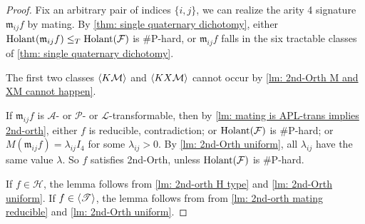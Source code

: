 \begin{proof}
    Fix an arbitrary pair of indices $\{i,j\}$, we can realize the arity 4 signature $\mathfrak{m}_{ij}f$ by mating.
    By \cref{thm: single quaternary dichotomy}, either $\operatorname{Holant}(\mathfrak{m}_{ij}f)\le_T\operatorname{Holant}(\mathcal{F})$ is \#P-hard, or $\mathfrak{m}_{ij}f$ falls in the six tractable classes of \cref{thm: single quaternary dichotomy}.
    
    The first two classes $\braket{K\mathcal{M}}$ and $\braket{KX\mathcal{M}}$ cannot occur by \cref{lm: 2nd-Orth M and XM cannot happen}.
    
    If $\mathfrak{m}_{ij}f$ is $\mathscr{A}$- or $\mathscr{P}$- or $\mathscr{L}$-transformable, then by \cref{lm: mating is APL-trans implies 2nd-orth}, either $f$ is reducible, contradiction; or $\operatorname{Holant}(\mathcal{F})$ is \#P-hard; or $M(\mathfrak{m}_{ij}f)=\lambda_{ij}I_4$ for some $\lambda_{ij}>0.$
    By \cref{lm: 2nd-Orth uniform}, all $\lambda_{ij}$ have the same value $\lambda$. 
    So $f$ satisfies {\sc 2nd-Orth}, unless $\operatorname{Holant}(\mathcal{F})$ is \#P-hard.

    If $f\in \mathscr{H}$, the lemma follows from \cref{lm: 2nd-orth H type} and \cref{lm: 2nd-Orth uniform}.
    If $f\in \braket{\mathscr{T}}$, the lemma follows from from \cref{lm: 2nd-orth mating reducible} and \cref{lm: 2nd-Orth uniform}.
\end{proof}




